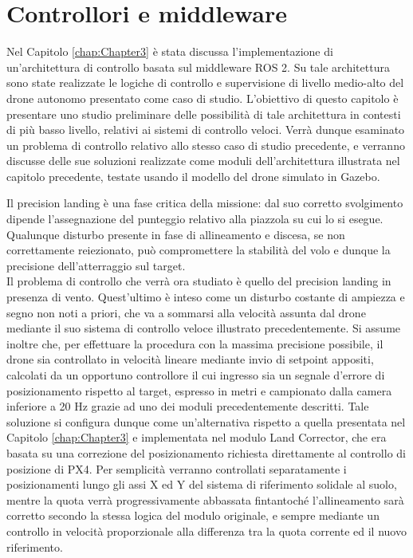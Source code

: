 
\chapter[Controllori e middleware]{Controllori e middleware}
\label{chap:Chapter4} 
\doublespacing
\fontsize{12}{12}\selectfont
{}
\indent Nel Capitolo \ref{chap:Chapter3} è stata discussa l'implementazione di un'architettura di controllo basata sul middleware ROS 2. Su tale architettura sono state realizzate le logiche di controllo e supervisione di livello medio-alto del drone autonomo presentato come caso di studio. L'obiettivo di questo capitolo è presentare uno studio preliminare delle possibilità di tale architettura in contesti di più basso livello, relativi ai sistemi di controllo veloci. Verrà dunque esaminato un problema di controllo relativo allo stesso caso di studio precedente, e verranno discusse delle sue soluzioni realizzate come moduli dell'architettura illustrata nel capitolo precedente, testate usando il modello del drone simulato in Gazebo.

\indent Il precision landing è una fase critica della missione: dal suo corretto svolgimento dipende l'assegnazione del punteggio relativo alla piazzola su cui lo si esegue. Qualunque disturbo presente in fase di allineamento e discesa, se non correttamente reiezionato, può compromettere la stabilità del volo e dunque la precisione dell'atterraggio sul target.\\
Il problema di controllo che verrà ora studiato è quello del precision landing in presenza di vento. Quest'ultimo è inteso come un disturbo costante di ampiezza e segno non noti a priori, che va a sommarsi alla velocità assunta dal drone mediante il suo sistema di controllo veloce illustrato precedentemente. Si assume inoltre che, per effettuare la procedura con la massima precisione possibile, il drone sia controllato in velocità lineare mediante invio di setpoint appositi, calcolati da un opportuno controllore il cui ingresso sia un segnale d'errore di posizionamento rispetto al target, espresso in metri e campionato dalla camera inferiore a 20 Hz grazie ad uno dei moduli precedentemente descritti. Tale soluzione si configura dunque come un'alternativa rispetto a quella presentata nel Capitolo \ref{chap:Chapter3} e implementata nel modulo Land Corrector, che era basata su una correzione del posizionamento richiesta direttamente al controllo di posizione di PX4. Per semplicità verranno controllati separatamente i posizionamenti lungo gli assi X ed Y del sistema di riferimento solidale al suolo, mentre la quota verrà progressivamente abbassata fintantoché l'allineamento sarà corretto secondo la stessa logica del modulo originale, e sempre mediante un controllo in velocità proporzionale alla differenza tra la quota corrente ed il nuovo riferimento.

